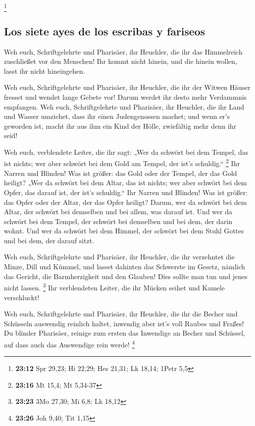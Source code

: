 \footnote{\textbf{23:12} Spr 29,23; Hi 22,29; Hes 21,31; Lk 18,14; 1Petr
  5,5}

\hypertarget{los-siete-ayes-de-los-escribas-y-fariseos}{%
\subsection{Los siete ayes de los escribas y
fariseos}\label{los-siete-ayes-de-los-escribas-y-fariseos}}

 Weh euch, Schriftgelehrte und Pharisäer, ihr Heuchler,
die ihr das Himmelreich zuschließet vor den Menschen! Ihr kommt nicht
hinein, und die hinein wollen, lasst ihr nicht hineingehen.

 Weh euch, Schriftgelehrte und Pharisäer, ihr Heuchler,
die ihr der Witwen Häuser fresset und wendet lange Gebete vor! Darum
werdet ihr desto mehr Verdammnis empfangen.  Weh euch,
Schriftgelehrte und Pharisäer, ihr Heuchler, die ihr Land und Wasser
umziehet, dass ihr einen Judengenossen machet; und wenn er's geworden
ist, macht ihr aus ihm ein Kind der Hölle, zwiefältig mehr denn ihr
seid!

 Weh euch, verblendete Leiter, die ihr sagt: „Wer da
schwört bei dem Tempel, das ist nichts; wer aber schwört bei dem Gold am
Tempel, der ist's schuldig.`` \footnote{\textbf{23:16} Mt 15,4; Mt
  5,34-37}  Ihr Narren und Blinden! Was ist größer: das
Gold oder der Tempel, der das Gold heiligt?  „Wer da
schwört bei dem Altar, das ist nichts; wer aber schwört bei dem Opfer,
das darauf ist, der ist's schuldig.``  Ihr Narren und
Blinden! Was ist größer: das Opfer oder der Altar, der das Opfer
heiligt?  Darum, wer da schwört bei dem Altar, der
schwört bei demselben und bei allem, was darauf ist.  Und
wer da schwört bei dem Tempel, der schwört bei demselben und bei dem,
der darin wohnt.  Und wer da schwört bei dem Himmel, der
schwört bei dem Stuhl Gottes und bei dem, der darauf sitzt.

 Weh euch, Schriftgelehrte und Pharisäer, ihr Heuchler,
die ihr verzehntet die Minze, Dill und Kümmel, und lasset dahinten das
Schwerste im Gesetz, nämlich das Gericht, die Barmherzigkeit und den
Glauben! Dies sollte man tun und jenes nicht lassen. \footnote{\textbf{23:23}
  3Mo 27,30; Mi 6,8; Lk 18,12}  Ihr verblendeten Leiter,
die ihr Mücken seihet und Kamele verschluckt!

 Weh euch, Schriftgelehrte und Pharisäer, ihr Heuchler,
die ihr die Becher und Schüsseln auswendig reinlich haltet, inwendig
aber ist's voll Raubes und Fraßes!  Du blinder Pharisäer,
reinige zum ersten das Inwendige an Becher und Schüssel, auf dass auch
das Auswendige rein werde! \footnote{\textbf{23:26} Joh 9,40; Tit 1,15}

